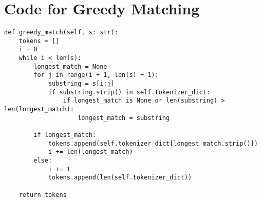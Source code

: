 \section{Code for Greedy Matching}\label{appendix:greedy_matching}

\begin{lstlisting}
def greedy_match(self, s: str):
    tokens = []
    i = 0
    while i < len(s):
        longest_match = None
        for j in range(i + 1, len(s) + 1):
            substring = s[i:j]
            if substring.strip() in self.tokenizer_dict:
                if longest_match is None or len(substring) > len(longest_match):
                    longest_match = substring

        if longest_match:
            tokens.append(self.tokenizer_dict[longest_match.strip()])
            i += len(longest_match)
        else:
            i += 1
            tokens.append(len(self.tokenizer_dict))

    return tokens
\end{lstlisting}